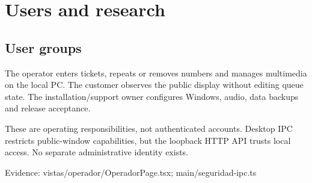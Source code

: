 \section{Users and research}
\subsection{User groups}

The operator enters tickets, repeats or removes numbers and manages multimedia on the local PC. The customer observes the public display without editing queue state. The installation/support owner configures Windows, audio, data backups and release acceptance.

These are operating responsibilities, not authenticated accounts. Desktop IPC restricts public-window capabilities, but the loopback HTTP API trusts local access. No separate administrative identity exists.

Evidence: vistas/operador/OperadorPage.tsx; main/seguridad-ipc.ts
